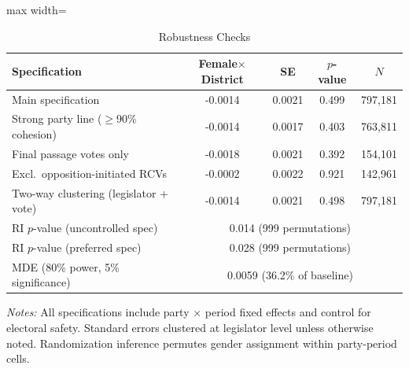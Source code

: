 \begin{table}[htbp]
\centering
\caption{Robustness Checks}
\label{tab:robustness}
\begin{adjustbox}{max width=\textwidth}
\begin{tabular}{lcccc}
\toprule
Specification & Female$\times$District & SE & $p$-value & $N$ \\
\midrule
Main specification & -0.0014 & 0.0021 & 0.499 & 797,181 \\
Strong party line ($\geq$90\% cohesion) & -0.0014 & 0.0017 & 0.403 & 763,811 \\
Final passage votes only & -0.0018 & 0.0021 & 0.392 & 154,101 \\
Excl.\ opposition-initiated RCVs & -0.0002 & 0.0022 & 0.921 & 142,961 \\
Two-way clustering (legislator + vote) & -0.0014 & 0.0021 & 0.498 & 797,181 \\
\midrule
RI $p$-value (uncontrolled spec) & \multicolumn{4}{c}{0.014 (999 permutations)} \\
RI $p$-value (preferred spec) & \multicolumn{4}{c}{0.028 (999 permutations)} \\
MDE (80\% power, 5\% significance) & \multicolumn{4}{c}{0.0059 (36.2\% of baseline)} \\
\bottomrule
\end{tabular}
\end{adjustbox}
\begin{minipage}{0.95\textwidth}
\footnotesize
\textit{Notes:} All specifications include party $\times$ period fixed effects and control for electoral safety. Standard errors clustered at legislator level unless otherwise noted. Randomization inference permutes gender assignment within party-period cells.
\end{minipage}
\end{table}
